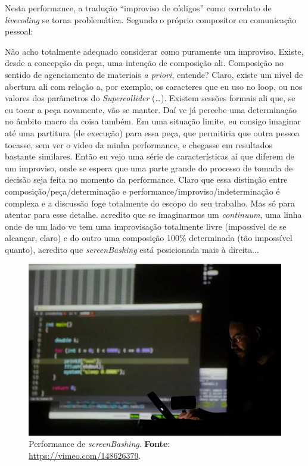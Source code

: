 Nesta performance, a tradução ``improviso de códigos'' como correlato de \emph{livecoding}  se torna problemática. Segundo o próprio compositor en comunicação pessoal:

\begin{citacao}
Não acho totalmente adequado considerar como puramente um improviso. Existe, desde a concepção da peça, uma intenção de composição ali. Composição no sentido de agenciamento de materiais \emph{a priori}, entende? Claro, existe um nível de abertura ali com relação a, por exemplo, os caracteres que eu uso no loop, ou nos valores dos parâmetros do \emph{Supercollider} (\ldots). Existem sessões formais ali que, se eu tocar a peça novamente, vão se manter. Daí vc já percebe uma determinação no âmbito macro da coisa também. Em uma situação limite, eu consigo imaginar até uma partitura (de execução) para essa peça, que permitiria que outra pessoa tocasse, sem ver o video da minha performance, e chegasse em resultados bastante similares. Então eu vejo uma série de características aí que diferem de um improviso, onde se espera que uma parte grande do processo de tomada de decisão seja feita no momento da performance. Claro que essa distinção entre composição/peça/determinação e performance/improviso/indeterminação é complexa e a discussão foge totalmente do escopo do seu trabalho. Mas só para atentar para esse detalhe. acredito que se imaginarmos um \emph{continuum}, uma linha onde de um lado vc tem uma improvisação totalmente livre (impossível de se alcançar, claro) e do outro uma composição 100\% determinada (tão impossível quanto), acredito que \emph{screenBashing} está posicionada mais à direita...
\end{citacao}

\begin{figure}[!h]
  \centering
  \includegraphics[scale=0.5]{imagens/screenbashing.png}
  \caption{Performance de \emph{screenBashing}. \textbf{Fonte}: \url{https://vimeo.com/148626379}.}
  \label{fig:screenbashing}
\end{figure}

